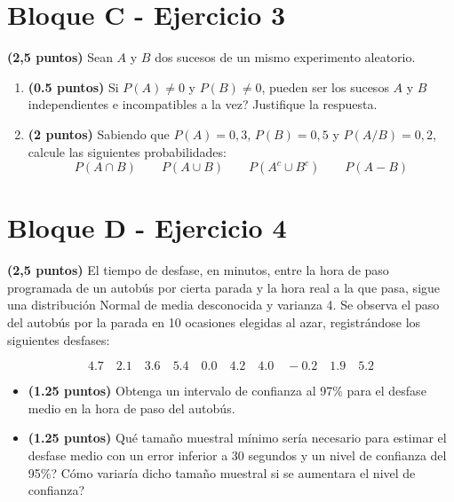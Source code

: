 \documentclass[11pt]{article}
\begin{document}
\clearpage
\section*{Bloque C - Ejercicio 3}
 \textbf{(2,5 puntos)} Sean \( A \) y \( B \) dos sucesos de un mismo experimento aleatorio.

\begin{enumerate}
    \item[\textbf{a)}] \textbf{(0.5 puntos)} Si \( P(A) \neq 0 \) y \( P(B) \neq 0 \), \textquestiondown{}pueden ser los sucesos \( A \) y \( B \) independientes e incompatibles a la vez? Justifique la respuesta.

    \item[\textbf{b)}] \textbf{(2 puntos)} Sabiendo que \( P(A) = 0{,}3 \), \( P(B) = 0{,}5 \) y \( P(A/B) = 0{,}2 \), calcule las siguientes probabilidades:
    \[
    P(A \cap B) \qquad P(A \cup B) \qquad P(A^c \cup B^c) \qquad P(A - B)
    \]
\end{enumerate}

\clearpage
\section*{Bloque D - Ejercicio 4}
 \textbf{(2,5 puntos)} El tiempo de desfase, en minutos, entre la hora de paso programada de un autobús por cierta parada y la hora real a la que pasa, sigue una distribución Normal de media desconocida y varianza 4. Se observa el paso del autobús por la parada en 10 ocasiones elegidas al azar, registrándose los siguientes desfases:

\[
4.7 \quad 2.1 \quad 3.6 \quad 5.4 \quad 0.0 \quad 4.2 \quad 4.0 \quad -0.2 \quad 1.9 \quad 5.2
\]

\begin{itemize}
    \item[a)] \textbf{(1.25 puntos)} Obtenga un intervalo de confianza al 97\% para el desfase medio en la hora de paso del autobús.

    \item[b)] \textbf{(1.25 puntos)} \textquestiondown{}Qué tamaño muestral mínimo sería necesario para estimar el desfase medio con un error inferior a 30 segundos y un nivel de confianza del 95\%? \textquestiondown{}Cómo variaría dicho tamaño muestral si se aumentara el nivel de confianza?
\end{itemize}
\end{document}
